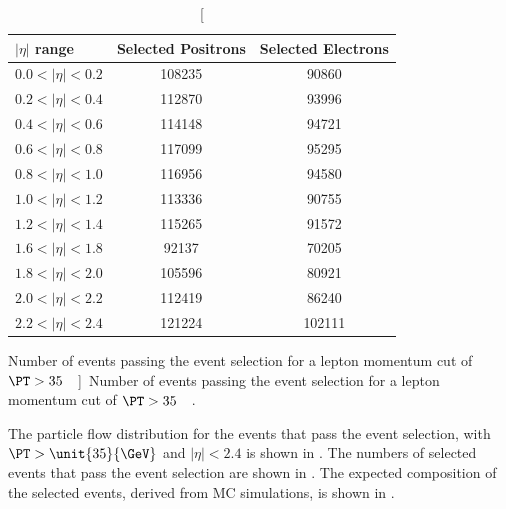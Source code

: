 \begin{table}[htbp]
 \begin{center}
 \begin{tabular}{lcc}
\toprule
 $|\eta|$ range & Selected Positrons & Selected Electrons\\
 \midrule
 $0.0<| \eta |<0.2$ & 108235 &  90860 \\
 $0.2<| \eta |<0.4$ & 112870 &  93996 \\
 $0.4<| \eta |<0.6$ & 114148 &  94721 \\
 $0.6<| \eta |<0.8$ & 117099 &  95295 \\
 $0.8<| \eta |<1.0$ & 116956 &  94580 \\
 $1.0<| \eta |<1.2$ & 113336 &  90755 \\
 $1.2<| \eta |<1.4$ & 115265 &  91572 \\
 $1.6<| \eta |<1.8$ &  92137 &  70205 \\
 $1.8<| \eta |<2.0$ & 105596 &  80921 \\
 $2.0<| \eta |<2.2$ & 112419 &  86240 \\
 $2.2<| \eta |<2.4$ & 121224 & 102111 \\
\bottomrule
 \end{tabular}
 \caption[Number of events passing the event selection for a lepton momentum cut
 of \unit{$\PT>35$}{\GeV}]{Number of events passing the event selection for a lepton momentum cut
 of \unit{$\PT>35$}{\GeV} \cite{bendavid2011electron}.}
\label{tab:updatedselectedevents}
\end{center}
\end{table}

The particle flow \ETm distribution for the events that pass the event
selection, with $\PT > \unit{35}{\GeV}$ and $|\eta| < 2.4$ is shown in
.
The numbers of selected events that pass the event selection are shown in
. 
The expected composition of the selected events, derived from MC simulations, is
shown in . 

